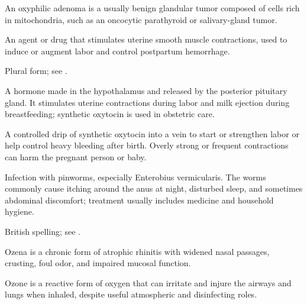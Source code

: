  An oxyphilic adenoma is a usually benign glandular tumor composed of cells rich in mitochondria, such as an oncocytic parathyroid or salivary-gland tumor.

 An agent or drug that stimulates uterine smooth muscle contractions, used to induce or augment labor and control postpartum hemorrhage.

 Plural form; see .

 A hormone made in the hypothalamus and released by the posterior pituitary gland. It stimulates uterine contractions during labor and milk ejection during breastfeeding; synthetic oxytocin is used in obstetric care.

 A controlled drip of synthetic oxytocin into a vein to start or strengthen labor or help control heavy bleeding after birth. Overly strong or frequent contractions can harm the pregnant person or baby.

 Infection with pinworms, especially Enterobius vermicularis. The worms commonly cause itching around the anus at night, disturbed sleep, and sometimes abdominal discomfort; treatment usually includes medicine and household hygiene.

 British spelling; see .

 Ozena is a chronic form of atrophic rhinitis with widened nasal passages, crusting, foul odor, and impaired mucosal function.

 Ozone is a reactive form of oxygen that can irritate and injure the airways and lungs when inhaled, despite useful atmospheric and disinfecting roles.
